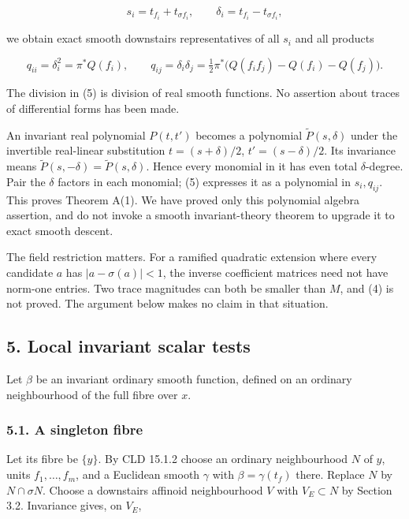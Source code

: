 \documentclass[
  11pt,
]{article}
\begin{document}
\[s_i=t_{f_i}+t_{\sigma f_i},\qquad \delta_i=t_{f_i}-t_{\sigma f_i},\]

we obtain exact smooth downstairs representatives of all \(s_i\) and all
products

\[
q_{ii}=\delta_i^2=\pi^*Q(f_i),\qquad
q_{ij}=\delta_i\delta_j=\tfrac12\pi^*\bigl(Q(f_if_j)-Q(f_i)-Q(f_j)\bigr). \tag{5}
\]

The division in (5) is division of real smooth functions. No assertion
about traces of differential forms has been made.

An invariant real polynomial \(P(t,t')\) becomes a polynomial
\(\widetilde P(s,\delta)\) under the invertible real-linear substitution
\(t=(s+\delta)/2\), \(t'=(s-\delta)/2\). Its invariance means
\(\widetilde P(s,-\delta)=\widetilde P(s,\delta)\). Hence every monomial
in it has even total \(\delta\)-degree. Pair the \(\delta\) factors in
each monomial; (5) expresses it as a polynomial in \(s_i,q_{ij}\). This
proves Theorem A(1). We have proved only this polynomial algebra
assertion, and do not invoke a smooth invariant-theory theorem to
upgrade it to exact smooth descent.

The field restriction matters. For a ramified quadratic extension where
every candidate \(a\) has \(|a-\sigma(a)|<1\), the inverse coefficient
matrices need not have norm-one entries. Two trace magnitudes can both
be smaller than \(M\), and (4) is not proved. The argument below makes
no claim in that situation.

\subsection{5. Local invariant scalar
tests}\label{local-invariant-scalar-tests}

Let \(\beta\) be an invariant ordinary smooth function, defined on an
ordinary neighbourhood of the full fibre over \(x\).

\subsubsection{5.1. A singleton fibre}\label{a-singleton-fibre}

Let its fibre be \(\{y\}\). By CLD 15.1.2 choose an ordinary
neighbourhood \(N\) of \(y\), units \(f_1,\ldots,f_m\), and a Euclidean
smooth \(\gamma\) with \(\beta=\gamma(t_f)\) there. Replace \(N\) by
\(N\cap\sigma N\). Choose a downstairs affinoid neighbourhood \(V\) with
\(V_E\subset N\) by Section 3.2. Invariance gives, on \(V_E\),
\end{document}
